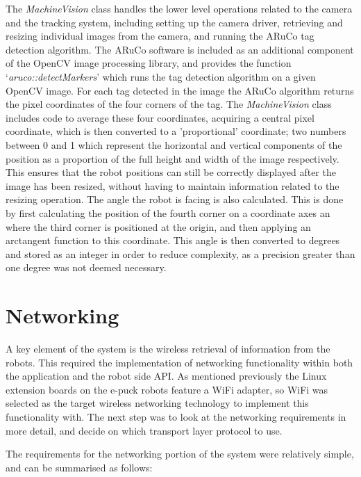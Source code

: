 The \textit{MachineVision} class handles the lower level operations related to the camera and the tracking system, including setting up the camera driver, retrieving and resizing individual images from the camera, and running the ARuCo tag detection algorithm. The ARuCo software is included as an additional component of the OpenCV image processing library, and provides the function `\textit{aruco::detectMarkers}' which runs the tag detection algorithm on a given OpenCV image. For each tag detected in the image the ARuCo algorithm returns the pixel coordinates of the four corners of the tag. The \textit{MachineVision} class includes code to average these four coordinates, acquiring a central pixel coordinate, which is then converted to a 'proportional' coordinate; two numbers between 0 and 1 which represent the horizontal and vertical components of the position as a proportion of the full height and width of the image respectively. This ensures that the robot positions can still be correctly displayed after the image has been resized, without having to maintain information related to the resizing operation. The angle the robot is facing is also calculated. This is done by first calculating the position of the fourth corner on a coordinate axes an where the third corner is positioned at the origin, and then applying an arctangent function to this coordinate. This angle is then converted to degrees and stored as an integer in order to reduce complexity, as a precision greater than one degree was not deemed necessary.


\section{Networking} \label{Networking}
A key element of the system is the wireless retrieval of information from the robots. This required the implementation of networking functionality within both the application and the robot side API. As mentioned previously the Linux extension boards on the e-puck robots feature a WiFi adapter, so WiFi was selected as the target wireless networking technology to implement this functionality with. The next step was to look at the networking requirements in more detail, and decide on which transport layer protocol to use.

The requirements for the networking portion of the system were relatively simple, and can be summarised as follows:

